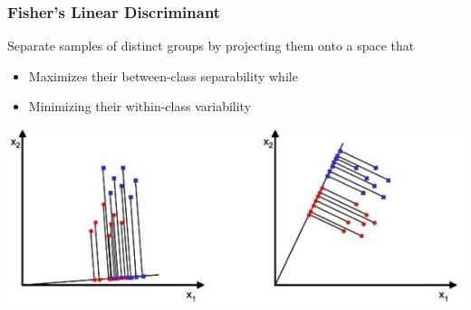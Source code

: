 \documentclass[aspectratio = 169]{beamer}
\begin{document}
\begin{frame}

\frametitle{Fisher's Linear Discriminant}

Separate samples of distinct groups by projecting them onto a space that 

\begin{itemize}

	\item Maximizes their between-class separability while

	\item Minimizing their within-class variability

\end{itemize}


\vspace{0.4cm}

\begin{centering}

\includegraphics[scale = 0.5]{Figures/fisher.jpg}

\end{centering}

\end{frame}
\end{document}
